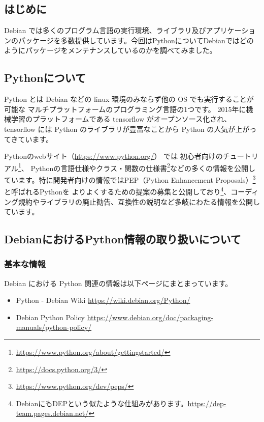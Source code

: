 \documentclass[mingoth,a4paper]{jsarticle}
\begin{document}
\subsection{はじめに}

Debian では多くのプログラム言語の実行環境、ライブラリ及びアプリケーションのパッケージを多数提供しています。今回はPythonについてDebianではどのようにパッケージをメンテナンスしているのかを調べてみました。

\subsection{Pythonについて}

Python とは Debian などの linux 環境のみならず他の OS でも実行することが可能な
マルチプラットフォームのプログラミング言語の1つです。
2015年に機械学習のプラットフォームである tensorflow がオープンソース化され、 tensorflow には Python のライブラリが豊富なことから Python の人気が上がってきています。

Pythonのwebサイト（\url{https://www.python.org/}） では
初心者向けのチュートリアル\footnote{\url{https://www.python.org/about/gettingstarted/}}、
Pythonの言語仕様やクラス・関数の仕様書\footnote{\url{https://docs.python.org/3/}}などの多くの情報を公開しています。特に開発者向けの情報ではPEP（Python Enhancement Proposals）\footnote{\url{https://www.python.org/dev/peps/}}と呼ばれるPythonを
よりよくするための提案の募集と公開しており\footnote{DebianにもDEPという似たような仕組みがあります。\url{https://dep-team.pages.debian.net/}}、コーディング規約やライブラリの廃止勧告、互換性の説明など多岐にわたる情報を公開しています。


\subsection{DebianにおけるPython情報の取り扱いについて}

\subsubsection{基本な情報}

Debian における Python 関連の情報は以下ページにまとまっています。

\begin{itemize}
\item Python - Debian Wiki \url{https://wiki.debian.org/Python/}
\item Debian Python Policy \url{https://www.debian.org/doc/packaging-manuals/python-policy/}
\end{itemize}
\end{document}
